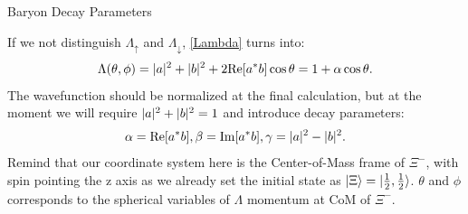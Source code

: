\documentclass[
	xcolor=dvipsnames,
	10pt, 
	]{beamer}
\begin{document}
\begin{frame}{Baryon Decay Parameters}
	\begin{block}{}
		If we not distinguish $\Lambda_{\uparrow}$ and $\Lambda_{\downarrow}$, \eqref{Lambda} turns into:
		\begin{align}
			\Lambda(\theta,\phi)=|a|^2+|b|^2+2\mathrm{Re}[a^*b]\cos\theta = 1+\alpha\cos\theta.\label{Spectra}
		\end{align}
		The wavefunction should be normalized at the final calculation, but at the moment we will require $|a|^2+|b|^2=1$ and introduce decay parameters:
		\begin{align}
			\alpha= \mathrm{Re}[a^*b], \beta = \mathrm{Im}[a^*b],\gamma = |a|^2-|b|^2.
		\end{align}
		Remind that our coordinate system here is the Center-of-Mass frame of $\Xi^-$, with spin pointing the z axis as we already set the initial state as $|\Xi\rangle=|\frac{1}{2},\frac{1}{2}\rangle$. $\theta$ and $\phi$ corresponds to the spherical variables of $\Lambda$ momentum at CoM of $\Xi^-$.
	\end{block}
\end{frame}
\end{document}
